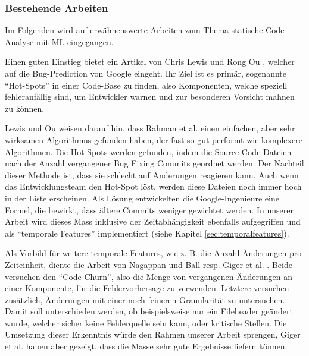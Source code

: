 \documentclass[10pt, a4paper]{article}
\begin{document}
\subsubsection{Bestehende Arbeiten} \label{sec:literatur}
Im Folgenden wird auf erwähnenswerte Arbeiten zum Thema statische Code-Analyse mit \ac{ML} eingegangen.

Einen guten Einstieg bietet ein Artikel von Chris Lewis und Rong Ou \cite{googlebugprediction}, welcher auf die Bug-Prediction von Google eingeht. Ihr Ziel ist es primär, sogenannte ``Hot-Spots'' in einer Code-Base zu finden, also Komponenten, welche speziell fehleranfällig sind, um Entwickler warnen und zur besonderen Vorsicht mahnen zu können.

Lewis und Ou weisen darauf hin, dass Rahman et al. \cite{rahman2011bugcache} einen einfachen, aber sehr wirksamen Algorithmus gefunden haben, der fast so gut performt wie komplexere Algorithmen. Die Hot-Spots werden gefunden, indem die Source-Code-Dateien nach der Anzahl vergangener Bug Fixing Commits geordnet werden. Der Nachteil dieser Methode ist, dass sie schlecht auf Änderungen reagieren kann. Auch wenn das Entwicklungsteam den Hot-Spot löst, werden diese Dateien noch immer hoch in der Liste erscheinen. Als Lösung entwickelten die Google-Ingenieure eine Formel, die bewirkt, dass ältere Commits weniger gewichtet werden. In unserer Arbeit wird dieses Mass inklusive der Zeitabhängigkeit ebenfalls aufgegriffen und als ``temporale Features'' implementiert (siehe Kapitel \ref{sec:temporalfeatures}).

Als Vorbild für weitere temporale Features, wie z. B. die Anzahl Änderungen pro Zeiteinheit, diente die Arbeit von Nagappan und Ball \cite{Nagappan2005} resp. Giger et al. \cite{Giger2011}. Beide versuchen den ``Code Churn'', also die Menge von vergangenen Änderungen an einer Komponente, für die Fehlervorhersage zu verwenden. Letztere versuchen zusätzlich, Änderungen mit einer noch feineren Granularität zu untersuchen. Damit soll unterschieden werden, ob beispielsweise nur ein Fileheader geändert wurde, welcher sicher keine Fehlerquelle sein kann, oder kritische Stellen. Die Umsetzung dieser Erkenntnis würde den Rahmen unserer Arbeit sprengen, Giger et al. haben aber gezeigt, dass die Masse sehr gute Ergebnisse liefern können.
\end{document}
